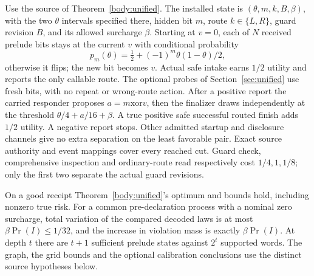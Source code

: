 \begin{theorem}\label{adv:ug3}
Use the source of Theorem~\ref{body:unified}. The installed state is \((\theta,m,k,B,\beta)\), with the two \(\theta\) intervals specified there, hidden bit \(m\), route \(k\in\{L,R\}\), guard revision \(B\), and its allowed surcharge \(\beta\). Starting at \(v=0\), each of \(N\) received prelude bits stays at the current \(v\) with conditional probability
\[
 p_m(\theta)=\tfrac12+(-1)^m\theta(1-\theta)/2,
\]
otherwise it flips; the new bit becomes \(v\). Actual safe intake earns \(1/2\) utility and reports the only callable route. The optional probes of Section~\ref{sec:unified} use fresh bits, with no repeat or wrong-route action. After a positive report the carried responder proposes \(a=m\mathbin{\mathrm{xor}}v\), then the finalizer draws independently at the threshold \(\theta/4+a/16+\beta\). A true positive safe successful routed finish adds \(1/2\) utility. A negative report stops. Other admitted startup and disclosure channels give no extra separation on the least favorable pair. Exact source authority and event mappings cover every reached cut. Guard check, comprehensive inspection and ordinary-route read respectively cost \(1/4,1,1/8\); only the first two separate the actual guard revisions.

On a good receipt Theorem~\ref{body:unified}'s optimum and bounds hold, including nonzero true risk. For a common pre-declaration process with a nominal zero surcharge, total variation of the compared decoded laws is at most \(\beta\Pr(I)\le1/32\), and the increase in violation mass is exactly \(\beta\Pr(I)\). At depth \(t\) there are \(t+1\) sufficient prelude states against \(2^t\) supported words. The graph, the grid bounds and the optional calibration conclusions use the distinct source hypotheses below.
\end{theorem}
